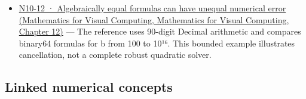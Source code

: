\begin{itemize}
\item
  \href{../02-Mathematics-for-Visual-Computing/main.pdf\#nameddest=02-foundations-ii-ch028-figure-n10-12-algebraically-equal-formulas-can-have-unequal-numerical-error}{N10-12 · Algebraically equal formulas can have unequal numerical error (Mathematics for Visual Computing, Mathematics for Visual Computing, Chapter 12)} --- The reference uses 90-digit Decimal arithmetic and compares binary64 formulas for b from 100 to 10¹⁶. This bounded example illustrates cancellation, not a complete robust quadratic solver.
\end{itemize}

\subsection{Linked numerical concepts}\label{appendix-cb5af353ef77-linked-numerical-concepts}

